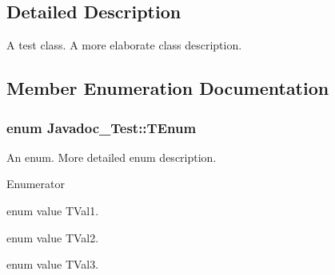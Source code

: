 \subsection{Detailed Description}
A test class. A more elaborate class description. 

\subsection{Member Enumeration Documentation}
\subsubsection[{\texorpdfstring{T\+Enum}{TEnum}}]{\setlength{\rightskip}{0pt plus 5cm}enum {\bf Javadoc\+\_\+\+Test\+::\+T\+Enum}}\hypertarget{class_javadoc___test_ae37fd1cbf1af522674cbd33873b786a6}{}\label{class_javadoc___test_ae37fd1cbf1af522674cbd33873b786a6}
An enum. More detailed enum description. \begin{Desc}
\item[Enumerator]\par
\begin{description}
\item[{\em 
T\+Val1\hypertarget{class_javadoc___test_ae37fd1cbf1af522674cbd33873b786a6a90f0d8d4f07a79342261fb1c191af72b}{}\label{class_javadoc___test_ae37fd1cbf1af522674cbd33873b786a6a90f0d8d4f07a79342261fb1c191af72b}
}]enum value T\+Val1. \item[{\em 
T\+Val2\hypertarget{class_javadoc___test_ae37fd1cbf1af522674cbd33873b786a6a5954e696a652f442d7255af4e0d35d61}{}\label{class_javadoc___test_ae37fd1cbf1af522674cbd33873b786a6a5954e696a652f442d7255af4e0d35d61}
}]enum value T\+Val2. \item[{\em 
T\+Val3\hypertarget{class_javadoc___test_ae37fd1cbf1af522674cbd33873b786a6ab4a4dc16e1050c9604cf5c46a51e5a8e}{}\label{class_javadoc___test_ae37fd1cbf1af522674cbd33873b786a6ab4a4dc16e1050c9604cf5c46a51e5a8e}
}]enum value T\+Val3. \end{description}
\end{Desc}


